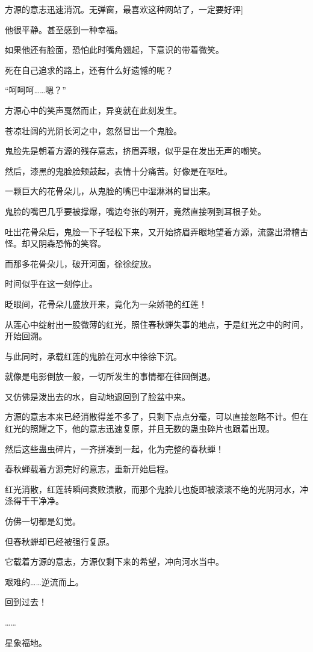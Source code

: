 \begin{this_body}
方源的意志迅速消沉。无弹窗，最喜欢这种网站了，一定要好评]

他很平静。甚至感到一种幸福。

如果他还有脸面，恐怕此时嘴角翘起，下意识的带着微笑。

死在自己追求的路上，还有什么好遗憾的呢？

“呵呵呵……嗯？”

方源心中的笑声戛然而止，异变就在此刻发生。

苍凉壮阔的光阴长河之中，忽然冒出一个鬼脸。

鬼脸先是朝着方源的残存意志，挤眉弄眼，似乎是在发出无声的嘲笑。

然后，漆黑的鬼脸脸颊鼓起，表情十分痛苦。好像是在呕吐。

一颗巨大的花骨朵儿，从鬼脸的嘴巴中湿淋淋的冒出来。

鬼脸的嘴巴几乎要被撑爆，嘴边夸张的咧开，竟然直接咧到耳根子处。

吐出花骨朵后，鬼脸一下子轻松下来，又开始挤眉弄眼地望着方源，流露出滑稽古怪。却又阴森恐怖的笑容。

而那多花骨朵儿，破开河面，徐徐绽放。

时间似乎在这一刻停止。

眨眼间，花骨朵儿盛放开来，竟化为一朵娇艳的红莲！

从莲心中绽射出一股微薄的红光，照住春秋蝉失事的地点，于是红光之中的时间，开始回溯。

与此同时，承载红莲的鬼脸在河水中徐徐下沉。

就像是电影倒放一般，一切所发生的事情都在往回倒退。

又仿佛是泼出去的水，自动地退回到了脸盆中来。

方源的意志本来已经消散得差不多了，只剩下点点分毫，可以直接忽略不计。但在红光的照耀之下，他的意志迅速复原，并且无数的蛊虫碎片也跟着出现。

然后这些蛊虫碎片，一齐拼凑到一起，化为完整的春秋蝉！

春秋蝉载着方源完好的意志，重新开始启程。

红光消散，红莲转瞬间衰败溃散，而那个鬼脸儿也旋即被滚滚不绝的光阴河水，冲涤得干干净净。

仿佛一切都是幻觉。

但春秋蝉却已经被强行复原。

它载着方源的意志，方源仅剩下来的希望，冲向河水当中。

艰难的……逆流而上。

回到过去！

……

星象福地。


\end{this_body}
